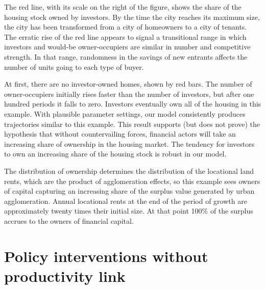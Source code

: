 


The red line, with its scale on the right of the figure, shows the share of the housing stock owned by investors. By the time the city reaches its maximum size, the city has been transformed from a city of homeowners to a city of tenants. The erratic rise of the red line appears to signal a transitional range in which investors and would-be owner-occupiers are similar in number and competitive strength. In that range, randomness in the savings of new entrants affects the number of units going to each type of buyer. 



At first, there are no investor-owned homes, shown by red bars. The number of owner-occupiers initially rises faster than the number of investors, but after one hundred periods it falls to zero. Investors eventually own all of the housing in this example.  With plausible parameter settings, our model consistently produces trajectories similar to this example. This result supports (but does not prove) the hypothesis that without countervailing forces, financial actors will take an increasing share of ownership in the housing market. The tendency for investors to own an increasing share of the housing stock is robust in our model. 

The distribution of ownership determines the distribution of the locational land rents, which are the product of agglomeration effects, so this example sees owners of capital capturing an increasing share of the surplus value generated by urban agglomeration. %
Annual locational rents at the end of the period of growth are approximately twenty times their initial size. At that point 100\% of the surplus accrues to the owners of financial capital.




\section{Policy interventions without productivity link}



